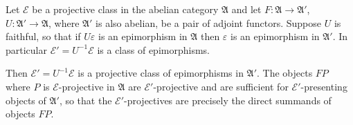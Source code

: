 Let $\mathcal{E}$ be a projective class in the abelian category $\mathfrak{A}$ and let $F: \mathfrak{A} \rightarrow \mathfrak{A}'$, $U: \mathfrak{A}' \rightarrow \mathfrak{A}$, where $\mathfrak{A}'$ is also abelian, be a pair of adjoint functors. Suppose $U$ is faithful, so that if $U\varepsilon$ is an epimorphism in $\mathfrak{A}$ then $\varepsilon$ is an epimorphism in $\mathfrak{A}'$. In particular $\mathcal{E}' = U^{-1}\mathcal{E}$ is a class of epimorphisms.

Then $\mathcal{E}' = U^{-1}\mathcal{E}$ is a projective class of epimorphisms in $\mathfrak{A}'$. The objects $FP$ where $P$ is $\mathcal{E}$-projective in $\mathfrak{A}$ are $\mathcal{E}'$-projective and are sufficient for $\mathcal{E}'$-presenting objects of $\mathfrak{A}'$, so that the $\mathcal{E}'$-projectives are precisely the direct summands of objects $FP$.
